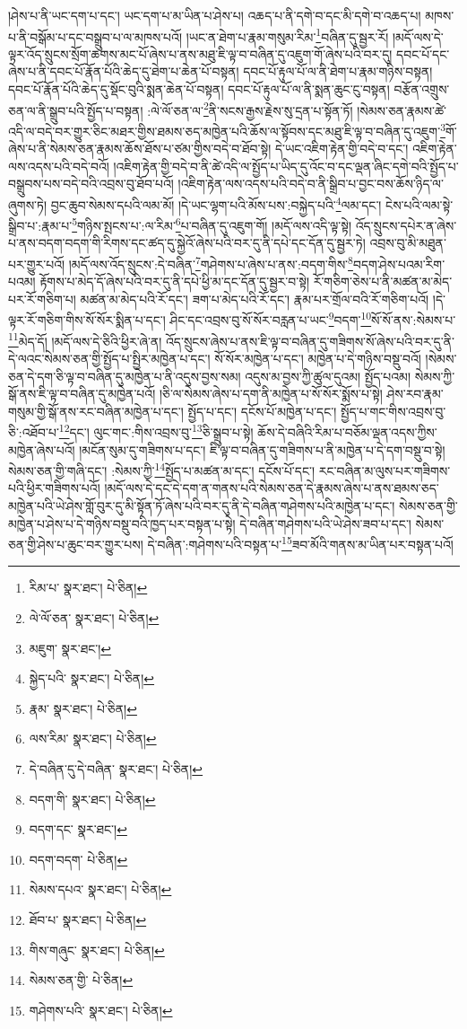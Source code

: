 །ཤེས་པ་ནི་ཡང་དག་པ་དང་། ཡང་དག་པ་མ་ཡིན་པ་ཤེས་པ། འཆད་པ་ནི་དགེ་བ་དང་མི་དགེ་བ་འཆད་པ། མཁས་པ་ནི་བསྒོམ་པ་དང་བསྒྲུབ་པ་ལ་མཁས་པའོ། །ཡང་ན་ཐེག་པ་རྣམ་གསུམ་རིམ་\footnote{རིམ་པ་  སྣར་ཐང་།  པེ་ཅིན། }བཞིན་དུ་སྦྱར་རོ། །མདོ་ལས་དེ་ལྟར་འོད་སྲུངས་སྲོག་ཆགས་མང་པོ་ཞེས་པ་ནས་མཐུ་ཇི་ལྟ་བ་བཞིན་དུ་འཇུག་གོ་ཞེས་པའི་བར་དུ། དབང་པོ་དང་ཞེས་པ་ནི་དབང་པོ་རྣོན་པོའི་ཆེད་དུ་ཐེག་པ་ཆེན་པོ་བསྟན། དབང་པོ་རྟུལ་པོ་ལ་ནི་ཐེག་པ་རྣམ་གཉིས་བསྟན། དབང་པོ་རྣོན་པོའི་ཆེད་དུ་སྡོང་བུའི་སྨན་ཆེན་པོ་བསྟན། དབང་པོ་རྟུལ་པོ་ལ་ནི་སྨན་ཆུང་ངུ་བསྟན། བརྩོན་འགྲུས་ཅན་ལ་ནི་སྒྲུབ་པའི་སྤྱོད་པ་བསྟན། :ལེ་ལོ་ཅན་ལ་\footnote{ལེ་ལོ་ཅན་  སྣར་ཐང་།  པེ་ཅིན། }ནི་སངས་རྒྱས་རྗེས་སུ་དྲན་པ་སྟོན་ཏོ། །སེམས་ཅན་རྣམས་ཚེ་འདི་ལ་བདེ་བར་གྱུར་ཅིང་མཐར་གྱིས་ཐམས་ཅད་མཁྱེན་པའི་ཆོས་ལ་སྟོབས་དང་མཐུ་ཇི་ལྟ་བ་བཞིན་དུ་འཇུག་\footnote{མཇུག་  སྣར་ཐང་། }གོ་ཞེས་པ་ནི་སེམས་ཅན་རྣམས་ཆོས་ཐོས་པ་ཙམ་གྱིས་བདེ་བ་ཐོབ་སྟེ། དེ་ཡང་འཇིག་རྟེན་གྱི་བདེ་བ་དང་། འཇིག་རྟེན་ལས་འདས་པའི་བདེ་བའོ། །འཇིག་རྟེན་གྱི་བདེ་བ་ནི་ཚེ་འདི་ལ་སྤྱོད་པ་ཡིད་དུ་འོང་བ་དང་ལྡན་ཞིང་དགེ་བའི་སྤྱོད་པ་བསྒྲུབས་པས་བདེ་བའི་འབྲས་བུ་ཐོབ་པའོ། །འཇིག་རྟེན་ལས་འདས་པའི་བདེ་བ་ནི་སྒྲིབ་པ་བྱང་བས་ཆོས་ཉིད་ལ་ཞུགས་ཏེ། བྱང་ཆུབ་སེམས་དཔའི་ལམ་མོ། །དེ་ཡང་ལྷག་པའི་མོས་པས་:བསྐྱེད་པའི་\footnote{སྐྱེད་པའི་  སྣར་ཐང་།  པེ་ཅིན། }ལམ་དང་། ངེས་པའི་ལམ་སྟེ་སྒྲིབ་པ་:རྣམ་པ་\footnote{རྣམ་  སྣར་ཐང་།  པེ་ཅིན། }གཉིས་སྤངས་པ་:ལ་རིམ་\footnote{ལས་རིམ་  སྣར་ཐང་།  པེ་ཅིན། }པ་བཞིན་དུ་འཇུག་གོ། །མདོ་ལས་འདི་ལྟ་སྟེ། འོད་སྲུངས་དཔེར་ན་ཞེས་པ་ནས་བདག་བདག་གི་རིགས་དང་ཚད་དུ་སྐྱེའོ་ཞེས་པའི་བར་དུ་ནི་དཔེ་དང་དོན་དུ་སྦྱར་ཏེ། འབྲས་བུ་མི་མཐུན་པར་གྱུར་པའོ། །མདོ་ལས་འོད་སྲུངས་:དེ་བཞིན་\footnote{དེ་བཞིན་དུ་དེ་བཞིན་  སྣར་ཐང་།  པེ་ཅིན། }གཤེགས་པ་ཞེས་པ་ནས་:བདག་གིས་\footnote{བདག་གི་  སྣར་ཐང་།  པེ་ཅིན། }བདག་ཤེས་པའམ་རིག་པའམ། རྟོགས་པ་མེད་དོ་ཞེས་པའི་བར་དུ་ནི་དཔེ་ཕྱི་མ་དང་དོན་དུ་སྦྱར་བ་སྟེ། རོ་གཅིག་ཅེས་པ་ནི་མཚན་མ་མེད་པར་རོ་གཅིག་པ། མཚན་མ་མེད་པའི་རོ་དང་། ཟག་པ་མེད་པའི་རོ་དང་། རྣམ་པར་གྲོལ་བའི་རོ་གཅིག་པའོ། །དེ་ལྟར་རོ་གཅིག་གིས་སོ་སོར་སྨིན་པ་དང་། ཤིང་དང་འབྲས་བུ་སོ་སོར་བརླན་པ་ཡང་\footnote{བདག་དང་  སྣར་ཐང་། }བདག་\footnote{བདག་བདག་  པེ་ཅིན། }སོ་སོ་ནས་:སེམས་པ་\footnote{སེམས་དཔའ་  སྣར་ཐང་།  པེ་ཅིན། }མེད་དོ། །མདོ་ལས་དེ་ཅིའི་ཕྱིར་ཞེ་ན། འོད་སྲུངས་ཞེས་པ་ནས་ཇི་ལྟ་བ་བཞིན་དུ་གཟིགས་སོ་ཞེས་པའི་བར་དུ་ནི་དེ་ལའང་སེམས་ཅན་གྱི་སྤྱོད་པ་སྤྱིར་མཁྱེན་པ་དང་། སོ་སོར་མཁྱེན་པ་དང་། མཁྱེན་པ་དེ་གཉིས་བསྡུ་བའོ། །སེམས་ཅན་དེ་དག་ཅི་ལྟ་བ་བཞིན་དུ་མཁྱེན་པ་ནི་འདུས་བྱས་སམ། འདུས་མ་བྱས་ཀྱི་ཚུལ་དུའམ། སྤྱོད་པའམ། སེམས་ཀྱི་སྒོ་ནས་ཇི་ལྟ་བ་བཞིན་དུ་མཁྱེན་པའོ། །ཅི་ལ་སེམས་ཞེས་པ་དག་ནི་མཁྱེན་པ་སོ་སོར་སྨོས་པ་སྟེ། ཤེས་རབ་རྣམ་གསུམ་གྱི་སྒོ་ནས་རང་བཞིན་མཁྱེན་པ་དང་། སྤྱོད་པ་དང་། དངོས་པོ་མཁྱེན་པ་དང་། སྤྱོད་པ་གང་གིས་འབྲས་བུ་ཅི་:འཐོབ་པ་\footnote{ཐོབ་པ་  སྣར་ཐང་།  པེ་ཅིན། }དང་། ལུང་གང་:གིས་འབྲས་བུ་\footnote{གིས་གཞུང་  སྣར་ཐང་།  པེ་ཅིན། }ཅི་སྒྲུབ་པ་སྟེ། ཆོས་དེ་བཞིའི་རིམ་པ་བཅོམ་ལྡན་འདས་ཀྱིས་མཁྱེན་ཞེས་པའོ། །མངོན་སུམ་དུ་གཟིགས་པ་དང་། ཇི་ལྟ་བ་བཞིན་དུ་གཟིགས་པ་ནི་མཁྱེན་པ་དེ་དག་བསྡུ་བ་སྟེ། སེམས་ཅན་གྱི་གཞི་དང་། :སེམས་ཀྱི་\footnote{སེམས་ཅན་གྱི་  པེ་ཅིན། }སྤྱོད་པ་མཚན་མ་དང་། དངོས་པོ་དང་། རང་བཞིན་མ་ལུས་པར་གཟིགས་པའི་ཕྱིར་གཟིགས་པའོ། །མདོ་ལས་དེ་དང་དེ་དག་ན་གནས་པའི་སེམས་ཅན་དེ་རྣམས་ཞེས་པ་ནས་ཐམས་ཅད་མཁྱེན་པའི་ཡེ་ཤེས་གློ་བུར་དུ་མི་སྟོན་ཏོ་ཞེས་པའི་བར་དུ་ནི་དེ་བཞིན་གཤེགས་པའི་མཁྱེན་པ་དང་། སེམས་ཅན་གྱི་མཁྱེན་པ་ཤེས་པ་དེ་གཉིས་བསྡུ་བའི་ཁྱད་པར་བསྟན་པ་སྟེ། དེ་བཞིན་གཤེགས་པའི་ཡེ་ཤེས་ཟབ་པ་དང་། སེམས་ཅན་གྱི་ཤེས་པ་ཆུང་བར་གྱུར་པས། དེ་བཞིན་:གཤེགས་པའི་བསྟན་པ་\footnote{གཤེགས་པའི་  སྣར་ཐང་།  པེ་ཅིན། }ཟབ་མོའི་གནས་མ་ཡིན་པར་བསྟན་པའོ། 